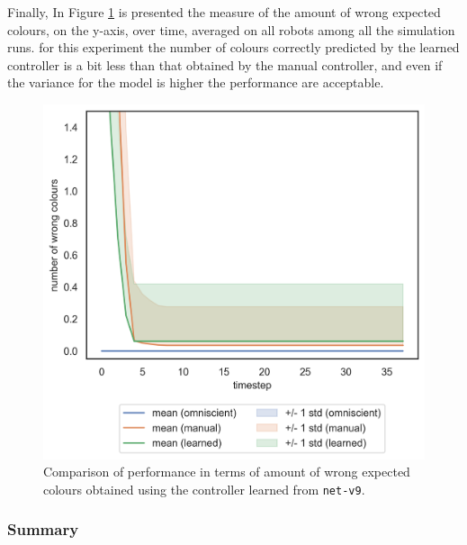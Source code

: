Finally, In Figure \ref{fig:net-v9error} is presented the measure of the amount of 
wrong expected colours, on the y-axis, over time, averaged on all robots among 
all the simulation runs. 
for this experiment the number of colours correctly predicted by the learned 
controller is a bit less than that obtained by the manual controller, and even if the 
variance for the model is higher the performance are acceptable.
\begin{figure}[!htb]
	\centering
	\includegraphics[width=.5\textwidth]{contents/images/net-v9/colours-errors-compressed}%
	\caption[Evaluation of \texttt{net-v9} amount of wrong expected 
	colours.]{Comparison of performance in terms of amount of wrong expected 
		colours obtained using the controller learned from \texttt{net-v9}.}
	\label{fig:net-v9error}
\end{figure}

\subsubsection{Summary}
\label{subsubsec:summary1}
